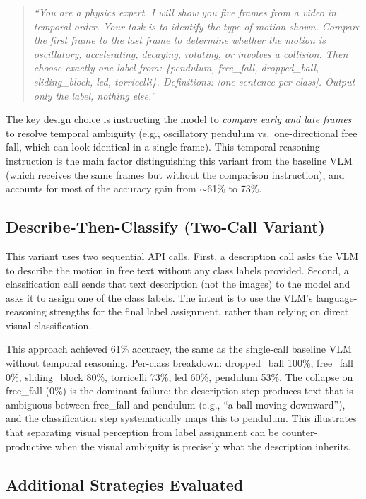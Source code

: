 \documentclass[runningheads]{llncs}
\begin{document}
\begin{quote}\small
\textit{``You are a physics expert. I will show you five frames from a video
in temporal order. Your task is to identify the type of motion shown.
Compare the first frame to the last frame to determine whether the motion
is oscillatory, accelerating, decaying, rotating, or involves a collision.
Then choose exactly one label from: \{pendulum, free\_fall, dropped\_ball,
sliding\_block, led, torricelli\}. Definitions: [one sentence per class].
Output only the label, nothing else.''}
\end{quote}

The key design choice is instructing the model to \emph{compare early and
late frames} to resolve temporal ambiguity (e.g., oscillatory pendulum vs.\
one-directional free fall, which can look identical in a single frame).
This temporal-reasoning instruction is the main factor distinguishing this
variant from the baseline VLM (which receives the same frames but without
the comparison instruction), and accounts for most of the accuracy gain
from $\sim$61\% to 73\%.

\subsection{Describe-Then-Classify (Two-Call Variant)}
\label{app:vlm_dtc}

This variant uses two sequential API calls.  First, a description call asks
the VLM to describe the motion in free text without any class labels
provided.  Second, a classification call sends that text description (not
the images) to the model and asks it to assign one of the class labels.
The intent is to use the VLM's language-reasoning strengths for the final
label assignment, rather than relying on direct visual classification.

This approach achieved 61\% accuracy, the same as the single-call baseline
VLM without temporal reasoning. Per-class breakdown:
dropped\_ball 100\%, free\_fall 0\%, sliding\_block 80\%, torricelli 73\%,
led 60\%, pendulum 53\%.
The collapse on free\_fall (0\%) is the dominant failure: the description
step produces text that is ambiguous between free\_fall and pendulum
(e.g., ``a ball moving downward''), and the classification step systematically
maps this to pendulum.  This illustrates that separating visual perception
from label assignment can be counter-productive when the visual ambiguity
is precisely what the description inherits.

\subsection{Additional Strategies Evaluated}
\label{app:vlm_alternatives}
\end{document}
